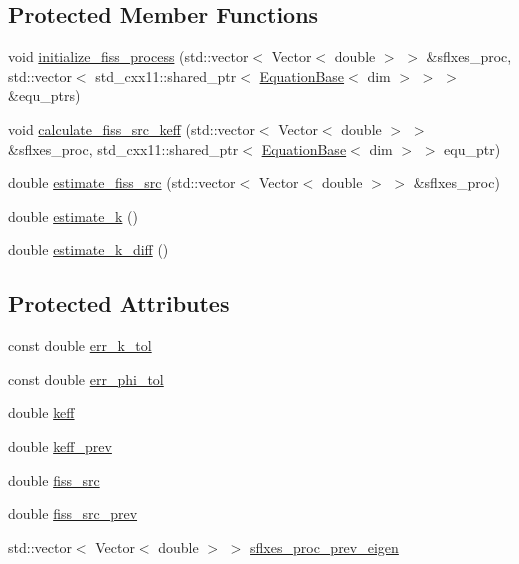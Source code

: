 \subsection*{Protected Member Functions}
\begin{DoxyCompactItemize}
\item 
void \hyperlink{class_eigen_base_a833156f74622e81a0e4e191e1b972186}{initialize\+\_\+fiss\+\_\+process} (std\+::vector$<$ Vector$<$ double $>$ $>$ \&sflxes\+\_\+proc, std\+::vector$<$ std\+\_\+cxx11\+::shared\+\_\+ptr$<$ \hyperlink{class_equation_base}{Equation\+Base}$<$ dim $>$ $>$ $>$ \&equ\+\_\+ptrs)
\item 
void \hyperlink{class_eigen_base_a325ceda011337e2416cef726bbd5d28f}{calculate\+\_\+fiss\+\_\+src\+\_\+keff} (std\+::vector$<$ Vector$<$ double $>$ $>$ \&sflxes\+\_\+proc, std\+\_\+cxx11\+::shared\+\_\+ptr$<$ \hyperlink{class_equation_base}{Equation\+Base}$<$ dim $>$ $>$ equ\+\_\+ptr)
\item 
double \hyperlink{class_eigen_base_ae733df97cbb04ca2e8a2568acdf9f222}{estimate\+\_\+fiss\+\_\+src} (std\+::vector$<$ Vector$<$ double $>$ $>$ \&sflxes\+\_\+proc)
\item 
double \hyperlink{class_eigen_base_a1ad5ce67d3534960731d34691db2f4d9}{estimate\+\_\+k} ()
\item 
double \hyperlink{class_eigen_base_ac9b7836c98e95a8be4d57b3ccf11f185}{estimate\+\_\+k\+\_\+diff} ()
\end{DoxyCompactItemize}
\subsection*{Protected Attributes}
\begin{DoxyCompactItemize}
\item 
const double \hyperlink{class_eigen_base_af082247a6dec17c46fd664a780d9a765}{err\+\_\+k\+\_\+tol}
\item 
const double \hyperlink{class_eigen_base_acc8e2b79484a329d746a55ba656feead}{err\+\_\+phi\+\_\+tol}
\item 
double \hyperlink{class_eigen_base_a9373e0bd7462b70829d88b82cb66ac10}{keff}
\item 
double \hyperlink{class_eigen_base_a1499f0cb877e5dff2013328e06a29b4a}{keff\+\_\+prev}
\item 
double \hyperlink{class_eigen_base_a6fa0753510038439c30de5c1832e4ebc}{fiss\+\_\+src}
\item 
double \hyperlink{class_eigen_base_aa324e40bd20edd51659416da3220d295}{fiss\+\_\+src\+\_\+prev}
\item 
std\+::vector$<$ Vector$<$ double $>$ $>$ \hyperlink{class_eigen_base_aec9885df50ea40a18fd5708061139843}{sflxes\+\_\+proc\+\_\+prev\+\_\+eigen}
\end{DoxyCompactItemize}


